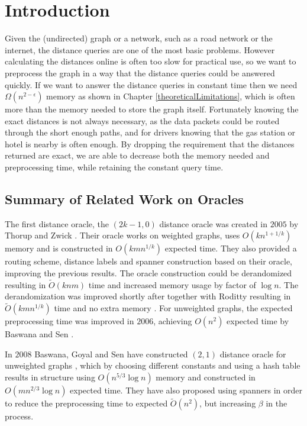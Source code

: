 \documentclass[shortabstract, lic, english]{iithesis}
\author         {Artur Błaszkiewicz}
\theoremstyle{definition} \newtheorem{definition}{Definition}[chapter]
\theoremstyle{plain} \newtheorem{remark}[definition]{Observation}
\theoremstyle{plain} \newtheorem{theorem}[definition]{Theorem}
\theoremstyle{plain} \newtheorem{lemma}[definition]{Lemma}
\theoremstyle{plain} \newtheorem{conjecture}[definition]{Conjecture}
\begin{document}

\chapter{Introduction}

Given the (undirected) graph or a network, such as a road network or the internet, the distance queries are one of the most basic problems.
However calculating the distances online is often too slow for practical use, so we want to preprocess the graph in a way that the distance queries could be answered quickly.
If we want to answer the distance queries in constant time then we need $\Omega(n^{2 - \epsilon})$ memory as shown in Chapter \ref{theoreticalLimitations},
which is often more than the memory needed to store the graph itself.
Fortunately knowing the exact distances is not always necessary, as the data packets could be routed through the short enough paths,
and for drivers knowing that the gas station or hotel is nearby is often enough. By dropping the requirement that the distances returned are exact,
we are able to decrease both the memory needed and preprocessing time, while retaining the constant query time.

\section{Summary of Related Work on Oracles}

The first distance oracle, the $(2k-1, 0)$ distance oracle was created in $2005$ by Thorup and Zwick \cite{a0OraclesBasic}.
Their oracle works on weighted graphs, uses $O(kn^{1+1/k})$ memory and is constructed in $O(kmn^{1/k})$ expected time.
They also provided a routing scheme, distance labels and spanner construction based on their oracle, improving the previous results.
The oracle construction could be derandomized resulting in $\tilde{O}(knm)$ time and increased memory usage by factor of $\log n$.
The derandomization was improved shortly after together with Roditty resulting in $\tilde{O}(kmn^{1/k})$ time and no extra memory \cite{a0OraclesMN1KDeterministicTime}.
For unweighted graphs, the expected preprocessing time was improved in $2006$, achieving $O(n^2)$ expected time by Baswana and Sen \cite{a0OraclesN2Time}.

In $2008$ Baswana, Goyal and Sen have constructed $(2,1)$ distance oracle for unweighted graphs \cite{21OracleBasic}, which by choosing different constants and using a hash table results in
structure using $O(n^{5/3} \log n)$ memory and constructed in $O(mn^{2/3} \log n)$ expected time.
They have also proposed using spanners in order to reduce the preprocessing time to expected $\tilde{O}(n^2)$, but increasing $\beta$ in the process.
\end{document}
